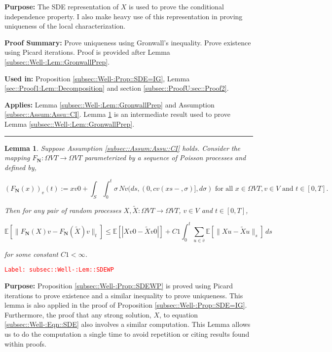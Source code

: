 \documentclass[12pt]{article}
\newcommand{\mb}{\mathbb}
\newcommand{\ra}{\rightarrow}
\newcommand{\ov}{\overline}
\newcommand{\te}{\text}
\newcommand{\tr}{\textcolor{red}}
\newcommand{\labe}[1]{\tr{\texttt{Label: #1}}}
\newcommand{\purpose}{\textbf{Purpose: }}
\newcommand{\pfsum}{\textbf{Proof Summary: }}
\newcommand{\usein}{\textbf{Used in: }}
\newcommand{\app}{\textbf{Applies: }}
\newcommand{\lin}{\rule{\linewidth}{0.4 pt}}
\newcommand{\ex}[1]{\mb{E}\left[#1\right]}			%
\renewcommand{\v}{v}							%
\newcommand{\vv}{u}								%
\renewcommand{\S}{S}							%
\newcommand{\s}{\sigma}							%
\newcommand{\T}{T}								%
\newcommand{\x}{x}								%
\renewcommand{\t}{t}							%
\renewcommand{\tt}{s}							%
\newcommand{\X}{X}								%
\newcommand{\IGr}{c}							%
\newcommand{\cind}[1]{_{#1}}					%
\newcommand{\cl}{\ov}							%
\newcommand{\tp}[1]{(#1)}						%
\newcommand{\const}{C}							%
\newcommand{\poisses}{\mathbf{N}}				%
\newcommand{\poiss}{N}							%
\newcommand{\Fpo}{F_{\poisses}}					%
\newcommand{\alt}[1]{\widetilde{#1}}			%
\newtheorem{lem}[thms]{Lemma}
\begin{document}
\purpose The SDE representation of \(\X{}{}\) is used to prove the conditional independence property. I also make heavy use of this representation in proving uniqueness of the local characterization.

\pfsum Prove uniqueness using Gronwall's inequality. Prove existence using Picard iterations. Proof is provided after Lemma \ref{subsec::Well-:Lem::GronwallPrep}.

\usein Proposition \ref{subsec::Well-:Prop::SDE=IG}, Lemma \ref{sec::Proof1:Lem::Decomposition} and section \ref{subsec::ProofU:sec::Proof2}.

\app Lemma \ref{subsec::Well-:Lem::GronwallPrep} and Assumption \ref{subsec::Assum:Assu::CI}. Lemma \ref{subsec::Well-:Lem::SDEWP} is an intermediate result used to prove Lemma \ref{subsec::Well-:Lem::GronwallPrep}.

\lin

\begin{lem}
Suppose Assumption \ref{subsec::Assum:Assu::CI} holds. Consider the mapping \(\Fpo: \Omega{V}{\T} \ra \Omega{V}{\T}\) parameterized by a sequence of Poisson processes and defined by,

\[\left(\Fpo(\x{}{})\right)\cind{\v}\tp{\t} := \x{\v}{0} + \int_\S\int_0^\t \s \,\poiss{\v}(d\tt,(0,\IGr{\v}(\x{}{\tt-},\s)],d\s) \te{ for all }\x{}{} \in \Omega{V}{\T}, \v \in V\te{ and }\t \in [0,\T].\]

Then for any pair of random processes \(\X{}{},\alt{\X}{}{}:\Omega{V}{\T} \ra \Omega{V}{\T}\), \(\v\in V\) and \(\t \in [0,\T]\),

\[\ex{\|\Fpo(\X{}{}){\v} - \Fpo(\alt{\X}{}{}){\v}\|_\t} \leq \ex{|\X{\v}{0} - \alt{\X}{\v}{0}|} +  \const{1}\int_0^\t \sum_{\vv\in \cl{\v}} \ex{\|\X{\vv}{} - \alt{\X}{\vv}{}\|_\tt}\,d\tt\]

for some constant \(\const{1} < \infty\).

\label{subsec::Well-:Lem::SDEWP}
\end{lem}
\labe{subsec::Well-:Lem::SDEWP}

\purpose Proposition \ref{subsec::Well-:Prop::SDEWP} is proved using Picard iterations to prove existence and a similar inequality to prove uniqueness. This lemma is also applied in the proof of Proposition \ref{subsec::Well-:Prop::SDE=IG}. Furthermore, the proof that any strong solution, \(\X{}{}\), to equation \eqref{subsec::Well-:Eqn::SDE} also involves a similar computation. This Lemma allows us to do the computation a single time to avoid repetition or citing results found within proofs.
\end{document}
